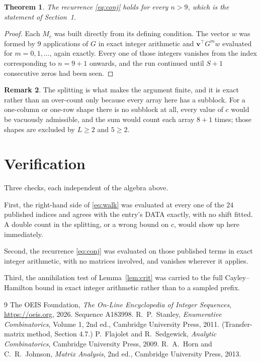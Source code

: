 \documentclass[11pt,a4paper]{article}
\theoremstyle{plain}
\newtheorem{theorem}{Theorem}
\theoremstyle{definition}
\newtheorem{remark}[theorem]{Remark}
\begin{document}
\begin{theorem}
The recurrence \eqref{eq:conj} holds for every $n>9$, which is the statement of
Section~1.
\end{theorem}

\begin{proof}
Each $M_c$ was built directly from its defining condition. The vector $w$ was formed by
$9$ applications of $G$ in exact integer arithmetic and $\mathbf{v}^{\!\top}G^{m}w$
evaluated for $m=0,1,\dots$, again exactly. Every one of those integers vanishes from the
index corresponding to $n=9+1$ onwards, and the run continued until $S+1$ consecutive
zeros had been seen.
\end{proof}

\begin{remark}
The splitting is what makes the argument finite, and it is exact rather than an
over-count only because every array here has a subblock. For a one-column or one-row
shape there is no subblock at all, every value of $c$ would be vacuously admissible, and the
sum would count each array $8+1$ times; those shapes are excluded by $L\ge2$ and
$5\ge2$.
\end{remark}

\section{Verification}

Three checks, each independent of the algebra above.

First, the right-hand side of \eqref{eq:walk} was evaluated at every one of the $24$
published indices and agrees with the entry's DATA exactly, with no shift fitted. A double
count in the splitting, or a wrong bound on $c$, would show up here immediately.

Second, the recurrence \eqref{eq:conj} was evaluated on those published terms in exact
integer arithmetic, with no matrices involved, and vanishes wherever it applies.

Third, the annihilation test of Lemma~\ref{lem:crit} was carried to the full
Cayley--Hamilton bound in exact integer arithmetic rather than to a sampled prefix.

\begin{thebibliography}{9}
 The OEIS Foundation, \emph{The On-Line Encyclopedia of Integer
Sequences}, \url{https://oeis.org}, 2026. Sequence A183998.
 R.~P.~Stanley, \emph{Enumerative Combinatorics}, Volume 1, 2nd ed.,
Cambridge University Press, 2011. (Transfer-matrix method, Section 4.7.)
 P.~Flajolet and R.~Sedgewick, \emph{Analytic Combinatorics}, Cambridge
University Press, 2009.
 R.~A.~Horn and C.~R.~Johnson, \emph{Matrix Analysis}, 2nd ed., Cambridge
University Press, 2013.
\end{thebibliography}
\end{document}
